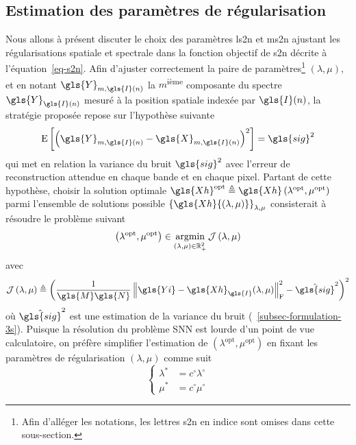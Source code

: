 \subsection{Estimation des paramètres de régularisation}\label{sec-s2n-param-tuning}

Nous allons à présent discuter le choix des paramètres \gls{ls2n} et \gls{ms2n} ajustant les régularisations spatiale et spectrale dans la fonction objectif de \gls{s2n} décrite à l'équation~\eqref{eq-s2n}. Afin d'ajuster correctement la paire de paramètres\footnote{Afin d'alléger les notations, les lettres \gls{s2n} en indice sont omises dans cette sous-section.} $(\lambda,\mu)$, et en notant $\gls{Y}_{m,\gls{I}(n)}$ la $m$\textsuperscript{ième} composante du spectre  $\gls{Y}_{\gls{I}(n)}$ mesuré à la position spatiale indexée par $\gls{I}(n)$, la stratégie proposée repose sur l'hypothèse suivante
\begin{equation}
    \mathrm{E}\left[ \left(  \gls{Y}_{m,\gls{I}(n)} - \gls{X}_{m,\gls{I}(n)}  \right)^2 \right] = \gls{sig}^2
\end{equation}
qui met en relation la variance du bruit $\gls{sig}^2$ avec l'erreur de reconstruction attendue en chaque bande et en chaque pixel.
%
Partant de cette hypothèse, choisir la solution optimale
$\gls{Xh}^{\textrm{opt}} \triangleq \gls{Xh}\left(\lambda^{\textrm{opt}}, \mu^{\textrm{opt}}\right)$
parmi l'ensemble de solutions possible 
$\left\{\gls{Xh}{\left(\lambda,\mu\right)}\right\}_{\lambda,\mu}$
consisterait à résoudre le problème suivant
\begin{equation}
\left(\lambda^{\textrm{opt}},\mu^{\textrm{opt}}\right) \in \operatornamewithlimits{argmin}_{(\lambda,\mu)\in\mathbb{R}_+^2} \mathcal{J}\left(\lambda,\mu\right)
\end{equation}
avec
\begin{equation}
\mathcal{J}\left(\lambda,\mu\right) \triangleq \left(\frac{1}{\gls{M}\gls{N}}\left\|\gls{Yi}-\gls{Xh}_{\gls{I}}{(\lambda,\mu)}\right\|_{\mathrm{F}}^2-\hat{\gls{sig}}^2\right)^2
\end{equation}
où $\hat{\gls{sig}}^2$ est une estimation de la variance du bruit (\cf\ \cref{subsec-formulation-3s}). Puisque la résolution du problème SNN est lourde d'un point de vue calculatoire, on préfère simplifier l'estimation de $\left(\lambda^{\textrm{opt}},\mu^{\textrm{opt}}\right)$ en fixant les paramètres de régularisation $(\lambda, \mu)$ comme suit
\begin{equation*}
\left\{
\begin{array}{cc}
\lambda^* &= c^\circ \lambda^{\circ} \\
\mu^*     &= c^\circ \mu^{\circ}
\end{array}
\right.
\end{equation*}
